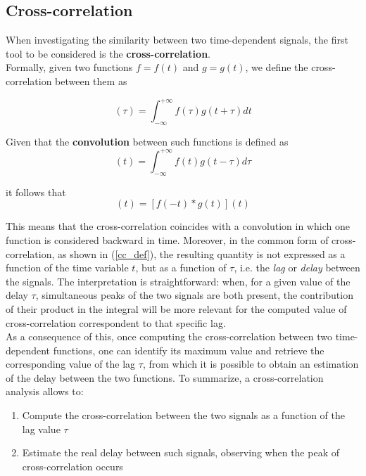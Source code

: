 \documentclass[12pt, a4paper]{article}
\begin{document}
\subsection{Cross-correlation}

When investigating the similarity between two time-dependent signals, the first tool to be considered is the \textbf{cross-correlation}.\\
Formally, given two functions $ f = f(t)$ and $ g = g(t)$, we define the cross-correlation between them as

\begin{equation}
[f(t) \star g(t)] (\tau) = \int_{-\infty}^{+\infty} f(\tau)g(t+\tau) dt \label{cc_def}
\end{equation}


Given that the \textbf{convolution} between such functions is defined as 
\begin{equation}
[f(t) * g (t)](t) = \int_{-\infty}^{+\infty} f(t) g (t-\tau) d\tau
\end{equation}

it follows that
\begin{equation}
[f(t) \star g(t)](t) = [f(-t) * g (t)](t) 
\end{equation}

This means that the cross-correlation coincides with a convolution in which one function is considered backward in time. Moreover, in the common form of cross-correlation, as shown in (\ref{cc_def}), the resulting quantity is not expressed as a function of the time variable $t$, but as a function of $\tau$, i.e. the \textit{lag} or \textit{delay} between the signals. The interpretation is straightforward: when, for a given value of the delay $\tau$, simultaneous peaks of the two signals are both present, the contribution of their product in the integral will be more relevant for the computed value of cross-correlation correspondent to  that specific lag.\\
As a consequence of this, once computing the cross-correlation between two time-dependent functions, one can identify its maximum value and retrieve the corresponding value of the lag $\tau$, from which it is possible to obtain an estimation of the delay between the two functions. To summarize, a cross-correlation analysis allows to:
\begin{enumerate}
	\item Compute the cross-correlation between the two signals as a function of the lag value  $\tau$
	
	\item Estimate the real delay between such signals, observing when the peak of cross-correlation occurs
\end{enumerate}
\end{document}
